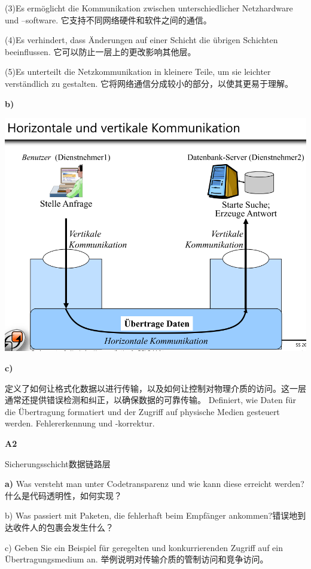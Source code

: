 \documentclass[fleqn]{article}
\begin{document}
\indent\indent (3)Es ermöglicht die Kommunikation zwischen unterschiedlicher Netzhardware und –software.
它支持不同网络硬件和软件之间的通信。

\indent\indent (4)Es verhindert, dass Änderungen auf einer Schicht die übrigen Schichten beeinflussen.
它可以防止一层上的更改影响其他层。

\indent\indent (5)Es unterteilt die Netzkommunikation in kleinere Teile, um sie leichter verständlich zu gestalten.
它将网络通信分成较小的部分，以使其更易于理解。

\textbf{b)}

\begin{center}
    \includegraphics[scale=0.4]{bild15.png}
\end{center}

\textbf{c)}

定义了如何让格式化数据以进行传输，以及如何让控制对物理介质的访问。这一层通常还提供错误检测和纠正，以确保数据的可靠传输。
Definiert, wie Daten für die Übertragung formatiert und der Zugriff auf physische Medien gesteuert werden. Fehlererkennung und -korrektur.

\noindent\textbf{A2}

Sicherungsschicht数据链路层

\textbf{a)} Was versteht man unter Codetransparenz und wie kann diese erreicht werden?什么是代码透明性，如何实现？

b) Was passiert mit Paketen, die fehlerhaft beim Empfänger ankommen?错误地到达收件人的包裹会发生什么？

c) Geben Sie ein Beispiel für geregelten und konkurrierenden Zugriff auf ein Übertragungsmedium an.
举例说明对传输介质的管制访问和竞争访问。
\end{document}
